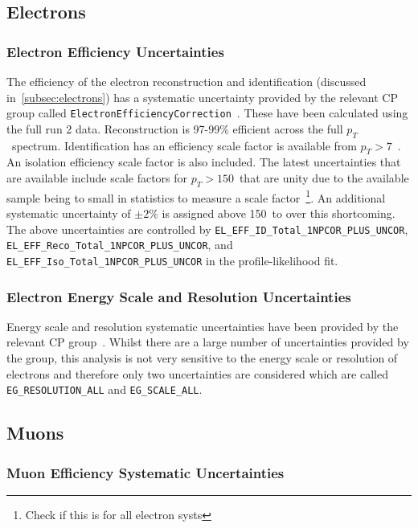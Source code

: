 \subsection{Electrons}

\subsubsection{Electron Efficiency Uncertainties}

The efficiency of the electron reconstruction and identification (discussed
in~\ref{subsec:electrons}) has a systematic uncertainty provided by the relevant
CP group called \texttt{ElectronEfficiencyCorrection}~\cite{electronTWiki}.
These have been calculated using the full run 2 data. Reconstruction is 97-99\%
efficient across the full $p_T$~spectrum. Identification has an efficiency scale
factor is available from $p_T>7$~\GeV. An isolation efficiency scale factor is
also included. The latest uncertainties that are available include scale factors
for $p_T>150$~\GeV that are unity due to the available sample being to small in
statistics to measure a scale factor~\footnote{Check if this is for all electron
  systs}. An additional systematic uncertainty of $\pm 2\%$ is assigned above
150~\GeV to over this shortcoming. The above uncertainties are controlled by
\texttt{EL\_EFF\_ID\_Total\_1NPCOR\_PLUS\_UNCOR},
\texttt{EL\_EFF\_Reco\_Total\_1NPCOR\_PLUS\_UNCOR}, and
\texttt{EL\_EFF\_Iso\_Total\_1NPCOR\_PLUS\_UNCOR} in the profile-likelihood fit.

\subsubsection{Electron Energy Scale and Resolution Uncertainties}

Energy scale and resolution systematic uncertainties have been provided by the
relevant CP group~\cite{EgammaCalibTWiki}. Whilst there are a large number of
uncertainties provided by the group, this analysis is not very sensitive to the
energy scale or resolution of electrons and therefore only two uncertainties are
considered which are called \texttt{EG\_RESOLUTION\_ALL} and
\texttt{EG\_SCALE\_ALL}.

\subsection{Muons}

\subsubsection{Muon Efficiency Systematic Uncertainties}

